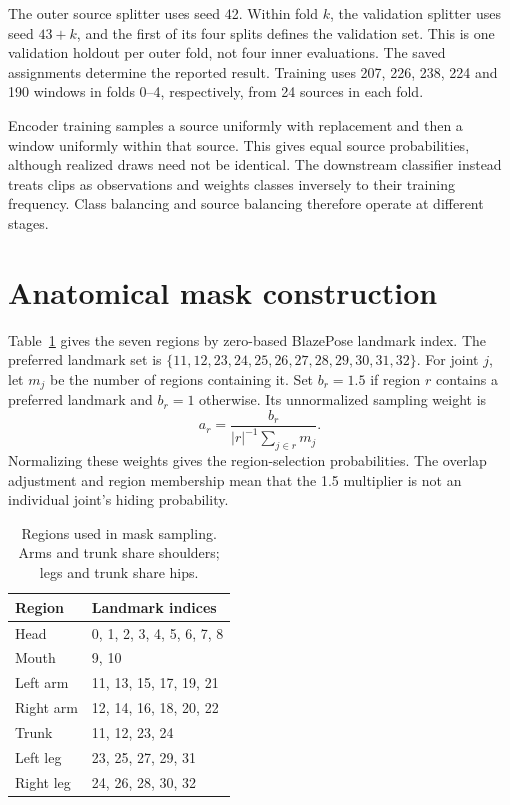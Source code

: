 \documentclass[10pt,twocolumn,letterpaper]{article}
\begin{document}
The outer source splitter uses seed 42. Within fold $k$, the validation splitter uses seed $43+k$, and the first of its four splits defines the validation set. This is one validation holdout per outer fold, not four inner evaluations. The saved assignments determine the reported result. Training uses 207, 226, 238, 224 and 190 windows in folds 0--4, respectively, from 24 sources in each fold.

Encoder training samples a source uniformly with replacement and then a window uniformly within that source. This gives equal source probabilities, although realized draws need not be identical. The downstream classifier instead treats clips as observations and weights classes inversely to their training frequency. Class balancing and source balancing therefore operate at different stages.

\section{Anatomical mask construction}
Table~\ref{tab:regions} gives the seven regions by zero-based BlazePose landmark index. The preferred landmark set is $\{11,12,23,24,25,26,27,28,29,30,31,32\}$. For joint $j$, let $m_j$ be the number of regions containing it. Set $b_r=1.5$ if region $r$ contains a preferred landmark and $b_r=1$ otherwise. Its unnormalized sampling weight is
\begin{equation}
a_r=\frac{b_r}{|r|^{-1}\sum_{j\in r}m_j}.
\end{equation}
Normalizing these weights gives the region-selection probabilities. The overlap adjustment and region membership mean that the 1.5 multiplier is not an individual joint's hiding probability.

\begin{table}[t]
\centering\small
\begin{tabular}{ll}
\toprule
Region & Landmark indices\\
\midrule
Head & 0, 1, 2, 3, 4, 5, 6, 7, 8\\
Mouth & 9, 10\\
Left arm & 11, 13, 15, 17, 19, 21\\
Right arm & 12, 14, 16, 18, 20, 22\\
Trunk & 11, 12, 23, 24\\
Left leg & 23, 25, 27, 29, 31\\
Right leg & 24, 26, 28, 30, 32\\
\bottomrule
\end{tabular}
\caption{Regions used in mask sampling. Arms and trunk share shoulders; legs and trunk share hips.}
\label{tab:regions}
\end{table}
\end{document}
